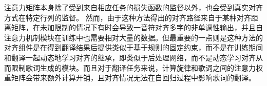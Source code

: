 注意力矩阵本身除了受到来自相应任务的损失函数的监督以外，也会受到真实对齐方式在特定行列的监督。
然而，由于这种方法得出的对齐路径来自于某种对齐距离矩阵，在未加限制的情况下有时会导致一音符对齐多字的非单调性输出，并且自注意力机制模块在训练中也需要相对大量的数据。但最重要的一点则是这种方法的对齐组件是在得到翻译结果后提供类似于基于规则的固定约束，而不是在训练期间和翻译一起动态地学习对齐的继承，即类似于后处理网络，而不是动态学习对齐从而限制歌词生成的模块。而且对于翻译任务来说，计算旋律和歌词之间的注意力权重矩阵会带来额外计算开销，且对齐情况无法在自回归过程中影响歌词的翻译。
